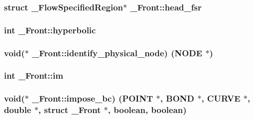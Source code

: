 \subsubsection[{\texorpdfstring{head\+\_\+fsr}{head_fsr}}]{\setlength{\rightskip}{0pt plus 5cm}struct {\bf \+\_\+\+Flow\+Specified\+Region}$\ast$ \+\_\+\+Front\+::head\+\_\+fsr}\hypertarget{struct___front_a7e712c67e687f5193a28079e56a3664b}{}\label{struct___front_a7e712c67e687f5193a28079e56a3664b}
\subsubsection[{\texorpdfstring{hyperbolic}{hyperbolic}}]{\setlength{\rightskip}{0pt plus 5cm}int \+\_\+\+Front\+::hyperbolic}\hypertarget{struct___front_ad41f662893fc5e37532ac2d53c32b2c2}{}\label{struct___front_ad41f662893fc5e37532ac2d53c32b2c2}
\subsubsection[{\texorpdfstring{identify\+\_\+physical\+\_\+node}{identify_physical_node}}]{\setlength{\rightskip}{0pt plus 5cm}void($\ast$ \+\_\+\+Front\+::identify\+\_\+physical\+\_\+node) ({\bf N\+O\+DE} $\ast$)}\hypertarget{struct___front_a4f462687303ad04d91d4611927501a36}{}\label{struct___front_a4f462687303ad04d91d4611927501a36}
\subsubsection[{\texorpdfstring{im}{im}}]{\setlength{\rightskip}{0pt plus 5cm}int \+\_\+\+Front\+::im}\hypertarget{struct___front_abbaf06450907211f7e26a643fccbf0d9}{}\label{struct___front_abbaf06450907211f7e26a643fccbf0d9}
\subsubsection[{\texorpdfstring{impose\+\_\+bc}{impose_bc}}]{\setlength{\rightskip}{0pt plus 5cm}void($\ast$ \+\_\+\+Front\+::impose\+\_\+bc) ({\bf P\+O\+I\+NT} $\ast$, {\bf B\+O\+ND} $\ast$, {\bf C\+U\+R\+VE} $\ast$, double $\ast$, struct {\bf \+\_\+\+Front} $\ast$, {\bf boolean}, {\bf boolean})}\hypertarget{struct___front_af24625822acdf4f3a82097be5109abf9}{}\label{struct___front_af24625822acdf4f3a82097be5109abf9}

